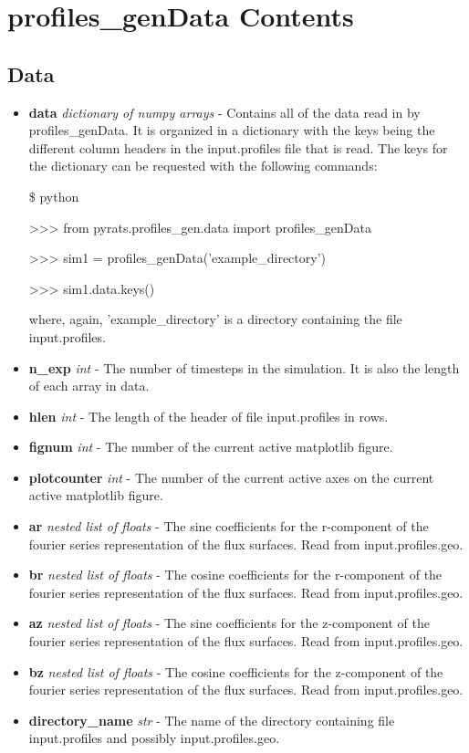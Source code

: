 \documentclass{article}
\begin{document}
\newpage

\section{profiles\_genData Contents}
\subsection{Data}
\begin{itemize}
\item \textbf{data} \emph{dictionary of numpy arrays} - Contains all of the data read in by profiles\_genData.  It is organized in a dictionary with the keys being the different column headers in the input.profiles file that is read.  The keys for the dictionary can be requested with the following commands:
\fontfamily{\ttdefault}\selectfont

\$ python

>>> from pyrats.profiles\_gen.data import profiles\_genData

>>> sim1 = profiles\_genData('example\_directory')

>>> sim1.data.keys()

\fontfamily{\rmdefault}\selectfont
\noindent where, again, 'example\_directory' is a directory containing the file input.profiles.
\item \textbf{n\_exp} \emph{int} - The number of timesteps in the simulation.  It is also the length of each array in data.
\item \textbf{hlen} \emph{int} - The length of the header of file input.profiles in rows.
\item \textbf{fignum} \emph{int} - The number of the current active matplotlib figure.
\item \textbf{plotcounter} \emph{int} - The number of the current active axes on the current active matplotlib figure.
\item \textbf{ar} \emph{nested list of floats} - The sine coefficients for the r-component of the fourier series representation of the flux surfaces.  Read from input.profiles.geo.
\item \textbf{br} \emph{nested list of floats} - The cosine coefficients for the r-component of the fourier series representation of the flux surfaces.  Read from input.profiles.geo.
\item \textbf{az} \emph{nested list of floats} - The sine coefficients for the z-component of the fourier series representation of the flux surfaces.  Read from input.profiles.geo.
\item \textbf{bz} \emph{nested list of floats} - The cosine coefficients for the z-component of the fourier series representation of the flux surfaces.  Read from input.profiles.geo.
\item \textbf{directory\_name} \emph{str} - The name of the directory containing file input.profiles and possibly input.profiles.geo.
\end{itemize}
\end{document}
